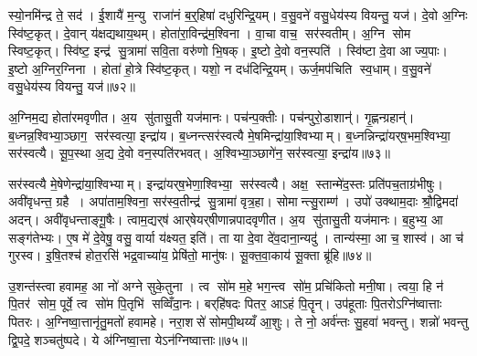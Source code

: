 स्यो॒नमि॑न्द्र ते॒ सद॑। ई॒शायै॑ म॒न्यु राजा॑नं ब॒र्॒हिषा॑ दधुरिन्द्रि॒यम्। व॒सु॒वने॑ वसु॒धेय॑स्य वियन्तु॒ यज॑। दे॒वो अ॒ग्निः स्वि॑ष्ट॒कृत्। दे॒वान् य॑क्षद्यथाय॒थम्। होता॑रा॒विन्द्र॑म॒श्विना। वा॒चा वाच॒ सर॑स्वतीम्। अ॒ग्नि सोम स्विष्ट॒कृत्। स्वि॑ष्ट॒ इन्द्र॑ सु॒त्रामा॑ सवि॒ता वरु॑णो भि॒षक्। इ॒ष्टो दे॒वो वन॒स्पति॑। स्वि॑ष्टा दे॒वा आज्य॒पाः। इ॒ष्टो अ॒ग्निर॒ग्निना। होता॑ हो॒त्रे स्वि॑ष्ट॒कृत्। यशो॒ न दध॑दिन्द्रि॒यम्। ऊर्ज॒मप॑चिति स्व॒धाम्। व॒सु॒वने॑ वसु॒धेय॑स्य वियन्तु॒ यज॑॥७२॥\anuvakamend[द्वारो॑ दधुरिन्द्रि॒यं व॑सु॒वने॑ वसु॒धेय॑स्य वियन्तु॒ यज॒ जोष्ट्रीभ्यान्दधुरिन्द्रि॒यं व॑सु॒वने॑ वसु॒धेय॑स्य वियन्तु॒ यज॒ होतृ॑भ्यान्दधुरिन्द्रि॒यं व॑सु॒वने॑ वसु॒धेय॑स्य वियन्तु॒ यजेन्द्रि॒याणि॑ वसु॒वने॑ वसु॒धेय॑स्य वियन्तु॒ यज॒ सर॑स्वत्या॒ वन॒स्पति॒ष्षट्च॑ (दे॒वं ब॒र्॒हिर्दे॒वीर्द्वारो॑ दे॒वी उ॒षासा॑व॒श्विना॑ दे॒वी जोष्ट्री॑ दे॒वी ऊ॒र्जाहु॑ती दे॒वा दे॒वानां भि॒षजा॑ वषट्का॒रैर्दे॒वीस्ति॒स्रस्ति॒स्रो दे॒वीर्दे॒व इन्द्रो॒ नरा॒शसो॑ दे॒व इन्द्रो॒ वन॒स्पति॑र्दे॒वं ब॒र्॒हिर्वारि॑तीनान्दे॒वो अ॒ग्निः स्वि॑ष्ट॒कृद्दे॒वान्। स॒मिधा॒ऽग्निन्दे॒वं ब॒र्॒हिः सर॑स्वत्य॒श्विना॒ सर्व॑ वियन्तु। द्वार॑स्ति॒स्रः सर्व॑वियन्तु। अ॒ज इन्द्र॒मोजो॒ऽग्निं पर॒ सर॑स्वतीम्। नक्तं॒ पूर्व॒ सर॑स्वति। अ॒न्यत्र॒ सर॑स्वती। भि॒षक्पूर्व॑न्दुह इन्द्रि॒यम्। अ॒न्यत्र॑ दधुरिन्द्रि॒यम्। सौ॒त्रा॒म॒ण्या सु॑तासु॒ती। अ॒ञ्जन्त्य॒यय्यँज॑मानः ॥ )]

अ॒ग्निम॒द्य होता॑रमवृणीत। अ॒य सु॑तासु॒ती यज॑मानः। पच॑न्प॒क्तीः। पच॑न्पुरो॒डाशान्॑। गृ॒ह्णन्ग्रहान्॑। ब॒ध्नन्न॒श्विभ्या॒ञ्छाग॒ सर॑स्वत्या॒ इन्द्रा॑य। ब॒ध्नन्त्सर॑स्वत्यै मे॒षमिन्द्रा॑या॒श्विभ्याम्। ब॒ध्नन्निन्द्रा॑यर्‌ष॒भम॒श्विभ्या॒ सर॑स्वत्यै। सू॒प॒स्था अ॒द्य दे॒वो वन॒स्पति॑रभवत्। अ॒श्विभ्या॒ञ्छागे॑न॒ सर॑स्वत्या॒ इन्द्रा॑य॥७३॥

सर॑स्वत्यै मे॒षेणेन्द्रा॑या॒श्विभ्याम्। इन्द्रा॑यर्‌ष॒भेणा॒श्विभ्या॒ सर॑स्वत्यै। अक्ष॒ स्तान्मे॑द॒स्तः प्रति॑पच॒ताग्र॑भीषुः। अवी॑वृधन्त॒ ग्रहै। अपा॑ताम॒श्विना॒ सर॑स्व॒तीन्द्र॑ सु॒त्रामा॑ वृत्र॒हा। सोमान्त्सु॒राम्ण॑। उपो॑ उक्थाम॒दाः श्रौ॒द्विमदा॑ अदन्। अवी॑वृधन्ताङ्गू॒षैः। त्वाम॒द्यर्‌ष॑ आर्‌षेयर्‌षीणान्नपादवृणीत। अ॒य सु॑तासु॒ती यज॑मानः। ब॒हुभ्य॒ आ सङ्ग॑तेभ्यः। ए॒ष मे॑ दे॒वेषु॒ वसु॒ वार्या य॑क्ष्यत॒ इति॑। ता या दे॒वा दे॑व॒दाना॒न्यदु॑। तान्य॑स्मा॒ आ च॒ शास्व॑। आ च॑ गुरस्व। इ॒षि॒तश्च॑ होत॒रसि॑ भद्र॒वाच्या॑य॒ प्रेषि॑तो॒ मानु॑षः। सू॒क्त॒वा॒काय॑ सू॒क्ता ब्रू॑हि॥७४॥\anuvakamend[इन्द्रा॑य॒ यज॑मानः स॒प्त च॑]

उ॒शन्त॑स्त्वा हवामह॒ आ नो॑ अग्ने सुके॒तुना। त्व सो॑म म॒हे भग॒न्त्व सो॑म॒ प्रचि॑कितो मनी॒षा। त्वया॒ हि न॑ पि॒तर॑ सोम॒ पूर्वे॒ त्व सो॑म पि॒तृभि॑ सव्विँदा॒नः। बर्‌हि॑षदः पितर॒ आऽहं पि॒तॄन्। उप॑हूताः पि॒तरोऽग्नि॑ष्वात्ताः पितरः। अ॒ग्निष्वा॒त्तानृ॑तु॒मतो॑ हवामहे। नरा॒शसे॑ सोमपी॒थय्यँ आ॒शुः। ते नो॒ अर्व॑न्तः सु॒हवा॑ भवन्तु। शन्नो॑ भवन्तु द्वि॒पदे॒ शञ्चतु॑ष्पदे। ये अ॑ग्निष्वा॒त्ता येऽन॑ग्निष्वात्ताः॥७५॥

